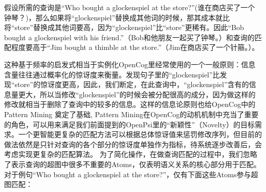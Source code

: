 假设所需的查询是“Who bought a glockenspiel at the store?”(谁在商店买了一个钟琴？)，那么如果将“glockenspiel”替换成其他词的时候，那其成本就比将“store”替换成其他词要高，因为“glockenspiel”比“store”更稀有。因此“Bob bought a glockenspiel with his friend.”（Bob和他朋友一起买了钟琴。）和查询的匹配程度要高于“Jim bought a thimble at the store.”（Jim在商店买了一个针箍。）。

这种基于频率的启发式相当于实例化OpenCog里经常使用的一个一般原则：信息含量往往通过概率化的惊讶度来衡量。发现句子里的“glockenspiel”比发现“store”的惊讶度更高，因此，我们断定，在此查询中，“glockenspiel”含有的信息量更大，所以当修改“glockenspiel”的时候会被分配很高的成分，因为做这样的修改就相当于删除了查询中的较多的信息。这样的信息论原则也给OpenCog中的Pattern Mining\cite{ONeill2012} 奠定了基础, Pattern Mining在OpenCog的动机机制中充当了重要的角色，可以用来满足我们前面提到的OpenPsi里的“新颖性”（Novelty）的目标需求。一个更智能更复杂的匹配方法可以根据总体惊讶值来惩罚修改序列，但目前的做法依然是只针对查询的各个部分的惊讶度单独作为指标，待系统逐步改善后，会考虑实现更复杂的匹配算法。
为了简化操作，在做查询匹配的过程中，我们忽略了表示查询的超图中很多不重要的Atoms，仅表明语义关系的核心部分用于匹配。对于例句“Who bought a glockenspiel at the store?”，仅有下面这些Atoms参与超图匹配：


